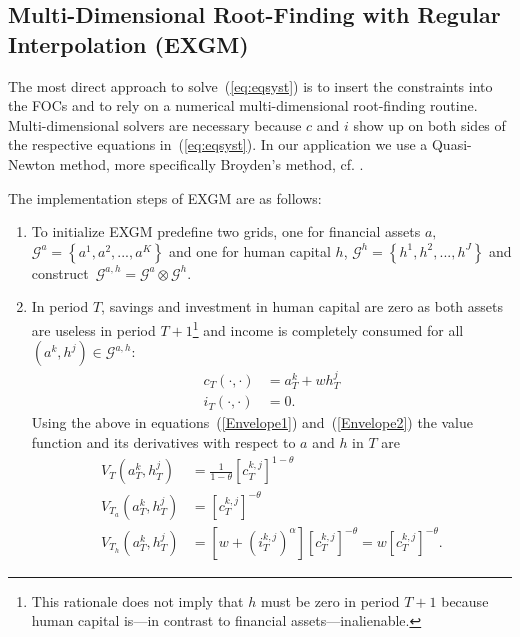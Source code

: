 \documentclass[a4paper,12pt]{article}%
\begin{document}
\subsection{Multi-Dimensional Root-Finding with Regular Interpolation (EXGM)}

The most direct approach to solve~(\ref{eq:eqsyst}) is to insert the constraints into the FOCs and to rely on a numerical multi-dimensional root-finding routine. Multi-dimensional solvers are necessary because $c$ and $i$ show up on both sides of the respective equations in~(\ref{eq:eqsyst}). In our application we use a Quasi-Newton method, more specifically Broyden's method, cf. .

The implementation steps of EXGM are as follows:

\begin{enumerate}
\item To initialize EXGM predefine two grids, one for financial assets $a,$ $\mathcal{G}^{a}=\left\{ a^{1},a^{2},...,a^{K}\right\}$ and one for human capital $h$, $\mathcal{G}^{h}=\left\{  h^{1},h^{2},...,h^{J}\right\}$ and construct~$\mathcal{G}^{a,h}=\mathcal{G}^{a}\otimes\mathcal{G}^{h}$.

\item In period $T$, savings and investment in human capital are zero as both assets are useless in period $T+1$\footnote{This rationale does not imply that $h$ must be zero in period $T+1$ because human capital is---in contrast to financial assets---inalienable.}
and income is completely consumed for all $\left(  a^{k},h^{j}\right)  \in\mathcal{G}^{a,h}$:
\begin{align*}
c_{T}\left( \cdot,\cdot\right)  &  =a_{T}^{k}+wh_{T}^{j}\\
i_{T}\left( \cdot,\cdot\right)  &  =0\text{.}
\end{align*}
Using the above in equations~(\ref{Envelope1}) and~(\ref{Envelope2}) the value function and its derivatives with respect to $a$ and $h$ in $T$ are
\begin{align*}
V_{T}\left(  a_{T}^{k},h_{T}^{j}\right)   &  =\frac{1}{1-\theta}\left[c_{T}^{k,j}\right]^{1-\theta}\\
\text{$V_{T_{a}}$}\left( a_{T}^{k},h_{T}^{j}\right)   &  =\left[  c_{T}^{k,j}\right]^{-\theta}\\
\text{$V_{T_{h}}$}\left( a_{T}^{k},h_{T}^{j}\right)   &  =\left[  w+ \left(i_{T}^{k,j}\right)^{\alpha}\right] \left[  c_{T}^{k,j}\right]^{-\theta}=w\left[ c_{T}^{k,j}\right]^{-\theta}\text{.}
\end{align*}


\end{enumerate}
\end{document}
